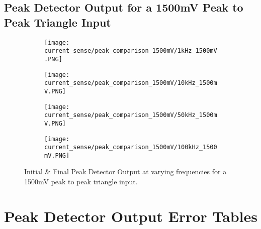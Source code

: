 \subsection{Peak Detector Output for a 1500mV Peak to Peak Triangle Input}
\begin{figure}[H]
    
    \centering
    \begin{subfigure}{0.45\textwidth}
        \texttt{[image: current\_sense/peak\_comparison\_1500mV/1kHz\_1500mV.PNG]}
    \end{subfigure}
    \begin{subfigure}{0.45\textwidth}
        \texttt{[image: current\_sense/peak\_comparison\_1500mV/10kHz\_1500mV.PNG]}
    \end{subfigure}
    \begin{subfigure}{0.45\textwidth}
        \texttt{[image: current\_sense/peak\_comparison\_1500mV/50kHz\_1500mV.PNG]}
    \end{subfigure}
    \begin{subfigure}{0.45\textwidth}
        \texttt{[image: current\_sense/peak\_comparison\_1500mV/100kHz\_1500mV.PNG]}
    \end{subfigure}
    \caption{Initial \& Final Peak Detector Output at varying frequencies for a 1500mV peak to peak triangle input.}
\end{figure}
    


\newpage
\section{Peak Detector Output Error Tables}\label{A:peak_detector_tables}


